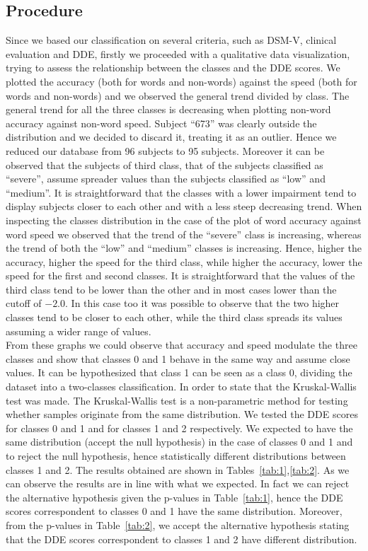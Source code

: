 \documentclass[11pt, a4paper, twoside, openright]{article}
\begin{document}
\subsection{Procedure}
Since we based our classification on several criteria, such as DSM-V,
clinical evaluation and DDE, firstly we proceeded with a qualitative
data visualization, trying to assess the relationship between the
classes and the DDE scores. We plotted the accuracy (both for words
and non-words) against the speed (both for words and non-words) and we
observed the general trend divided by class. The general trend for all
the three classes is decreasing when plotting non-word accuracy
against non-word speed. Subject ``673'' was clearly outside the
distribution and we decided to discard it, treating it as an
outlier. Hence we reduced our database from 96 subjects to 95
subjects. Moreover it can be observed that the subjects of third
class, that of the subjects classified as ``severe'', assume spreader
values than the subjects classified as ``low'' and ``medium''. It is
straightforward that the classes with a lower impairment tend to
display subjects closer to each other and with a less steep decreasing
trend. When inspecting the classes distribution in the case of the
plot of word accuracy against word speed we observed that the trend of
the ``severe'' class is increasing, whereas the trend of both the
``low'' and ``medium'' classes is increasing. Hence, higher the
accuracy, higher the speed for the third class, while higher the
accuracy, lower the speed for the first and second classes. It is
straightforward that the values of the third class tend to be lower
than the other and in most cases lower than the cutoff of $-2.0$. In
this case too it was possible to observe that the two higher classes
tend to be closer to each other, while the third class spreads its
values assuming a wider range of values.\\
From these graphs we could observe that accuracy and speed modulate
the three classes and show that classes 0 and 1 behave in the same way
and assume close values. It can be hypothesized that class 1 can be
seen as a class 0, dividing the dataset into a two-classes
classification. In order to state that the Kruskal-Wallis test was
made. The Kruskal-Wallis test is a non-parametric method for testing
whether samples originate from the same distribution. We tested the
DDE scores for classes 0 and 1 and for classes 1 and 2
respectively. We expected to have the same distribution (accept the
null hypothesis) in the case of classes 0 and 1 and to reject the null
hypothesis, hence statistically different distributions between
classes 1 and 2. The results obtained are shown in
Tables~\ref{tab:1},\ref{tab:2}. As we can observe the results are in
line with what we expected. In fact we can reject the alternative
hypothesis given the p-values in Table~\ref{tab:1}, hence the DDE
scores correspondent to classes 0 and 1 have the same
distribution. Moreover, from the p-values in Table~\ref{tab:2}, we
accept the alternative hypothesis stating that the DDE scores
correspondent to classes 1 and 2 have different distribution.
\end{document}
